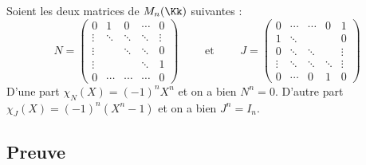 \documentclass[12pt, class=report,crop=false]{standalone}
\begin{document}
\begin{exemple}
Soient les deux matrices de $M_n(\Kk)$ suivantes :
\[N = \begin{pmatrix}
0& 1& 0 &\cdots&0\\
\vdots&\ddots&\ddots&\ddots&\vdots\\
\vdots&&\ddots&\ddots&0\\
\vdots&& &\ddots&1\\
0 &\cdots&\cdots &\cdots&0
\end{pmatrix}
\qquad  \text{ et } \qquad 
J = \begin{pmatrix}
0&\cdots&\cdots&0&1\\
1&\ddots&&&0\\
0&\ddots&\ddots&&\vdots\\
\vdots&\ddots&\ddots&\ddots&\vdots\\
0&\cdots&0&1&0
\end{pmatrix}\]
D'une part $\chi_N(X) = (-1)^nX^n$ et on a bien $N^n=0$.
D'autre part $\chi_J(X) = (-1)^n(X^n -1)$  et on a bien $J^n = I_n$.
\end{exemple}


\subsection{Preuve}
\end{document}
